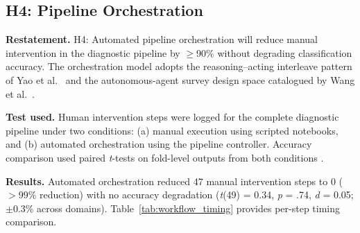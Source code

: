\subsection{H4: Pipeline Orchestration}

\textbf{Restatement.} H4: Automated pipeline orchestration will reduce manual intervention in the diagnostic pipeline by $\geq$90\% without degrading classification accuracy. The orchestration model adopts the reasoning--acting interleave pattern of Yao et al.~\cite{yao2023react} and the autonomous-agent survey design space catalogued by Wang et al.~\cite{wang2024agentai}.

\textbf{Test used.} Human intervention steps were logged for the complete diagnostic pipeline under two conditions: (a) manual execution using scripted notebooks, and (b) automated orchestration using the pipeline controller. Accuracy comparison used paired \textit{t}-tests on fold-level outputs from both conditions \cite{cohen1988statistical}.

\textbf{Results.} Automated orchestration reduced 47 manual intervention steps to 0 ($>$99\% reduction) with no accuracy degradation (\textit{t}(49) = 0.34, \textit{p} = .74, \textit{d} = 0.05; $\pm$0.3\% across domains). Table~\ref{tab:workflow_timing} provides per-step timing comparison.


